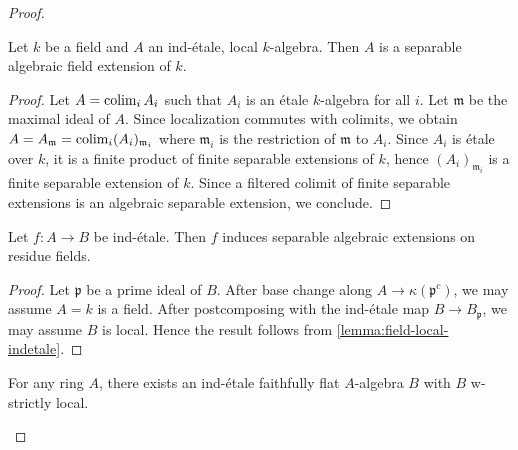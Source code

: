 \begin{proof}
\begin{lemma}
    Let $k$ be a field and $A$ an ind-étale, local $k$-algebra. Then $A$ is
    a separable algebraic field extension of $k$.
    \label{lemma:field-local-indetale}
\end{lemma}

\begin{proof}
    Let $A = \operatorname{colim}_i A_i$ such that $A_i$ is an étale $k$-algebra for all $i$.
    Let $\mathfrak{m}$ be the maximal ideal of $A$. Since localization commutes with colimits,
    we obtain $A = A_{\mathfrak{m}} = \operatorname{colim}_i (A_i)_{\mathfrak{m}_i}$ where
    $\mathfrak{m}_i$ is the restriction of $\mathfrak{m}$ to $A_i$. Since $A_i$ is étale over $k$,
    it is a finite product of finite separable extensions of $k$, hence $(A_i)_{\mathfrak{m}_i}$
    is a finite separable extension of $k$. Since a filtered colimit of finite separable
    extensions is an algebraic separable extension, we conclude.
\end{proof}

\begin{proposition}
    Let $f\colon A \to B$ be ind-étale. Then $f$ induces separable algebraic extensions on residue fields.
    \label{prop:ind-etale-residue-fields}
\end{proposition}

\begin{proof}
    Let $\mathfrak{p}$ be a prime ideal of $B$. After base change along $A \to \kappa(\mathfrak{p}^c)$,
    we may assume $A = k$ is a field. After postcomposing with the ind-étale map $B \to B_{\mathfrak{p}}$,
    we may assume $B$ is local. Hence the result follows from \ref{lemma:field-local-indetale}.
\end{proof}

\begin{proposition}
    For any ring \(A\), there exists an ind-étale faithfully flat \(A\)-algebra \(B\) with \(B\) w-strictly local.
    \label{thm:ind-etale-w-strictly-local-cover}
\end{proposition}


\end{proof}
